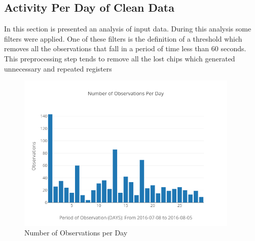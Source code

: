 \documentclass[11pt,fleqn]{book} %
\begin{document}
\subsection{Activity Per Day of Clean Data}%
\label{subsec:Activity Per Day of Clean Data}%
In this section is presented an analysis of input data. During this analysis some filters were applied. One of these filters is the definition of a threshold which removes all the observations that fall in a period of time less than 60 seconds. This preprocessing step tends to  remove all the lost chips which generated unnecessary and repeated registers %


\begin{figure}[h!]%
\centering%
\includegraphics[width=400px]{Pictures/Morelia Hive 1observationsPerdayClean.png}%
\caption{Number of Observations per Day}%
\end{figure}
\end{document}
